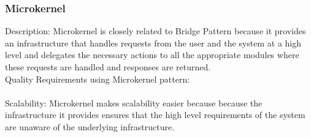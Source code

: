 \subsubsection{Microkernel}
Description: Microkernel is closely related to Bridge Pattern because it provides an infrastructure that handles requests from the user and the system at a high level and delegates the necessary actions to all the appropriate modules where these requests are handled and responses are returned.
\\
Quality Requirements using Microkernel pattern:\\
\\
Scalability: Microkernel makes scalability easier because because the infrastructure it provides ensures that the high level requirements of the system are unaware of the underlying infrastructure.\\